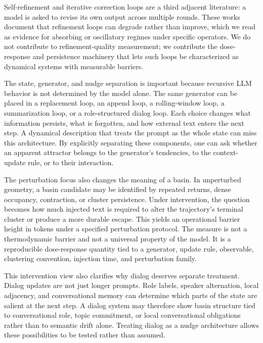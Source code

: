\documentclass{article}
\theoremstyle{plain}
\theoremstyle{definition}
\begin{document}
Self-refinement and iterative correction loops \citep{arxiv230317651,arxiv221100053,arxiv230803188,arxiv231001798} are a third adjacent literature: a model is asked to revise its own output across multiple rounds. These works document that refinement loops can degrade rather than improve, which we read as evidence for absorbing or oscillatory regimes under specific operators. We do not contribute to refinement-quality measurement; we contribute the dose-response and persistence machinery that lets such loops be characterized as dynamical systems with measurable barriers.

The state, generator, and nudge separation is important because recursive LLM behavior is not determined by the model alone. The same generator can be placed in a replacement loop, an append loop, a rolling-window loop, a summarization loop, or a role-structured dialog loop. Each choice changes what information persists, what is forgotten, and how external text enters the next step. A dynamical description that treats the prompt as the whole state can miss this architecture. By explicitly separating these components, one can ask whether an apparent attractor belongs to the generator's tendencies, to the context-update rule, or to their interaction.

The perturbation focus also changes the meaning of a basin. In unperturbed geometry, a basin candidate may be identified by repeated returns, dense occupancy, contraction, or cluster persistence. Under intervention, the question becomes how much injected text is required to alter the trajectory's terminal cluster or produce a more durable escape. This yields an operational barrier height in tokens under a specified perturbation protocol. The measure is not a thermodynamic barrier and not a universal property of the model. It is a reproducible dose-response quantity tied to a generator, update rule, observable, clustering convention, injection time, and perturbation family.

This intervention view also clarifies why dialog deserves separate treatment. Dialog updates are not just longer prompts. Role labels, speaker alternation, local adjacency, and conversational memory can determine which parts of the state are salient at the next step. A dialog system may therefore show basin structure tied to conversational role, topic commitment, or local conversational obligations rather than to semantic drift alone. Treating dialog as a nudge architecture allows these possibilities to be tested rather than assumed.
\end{document}
